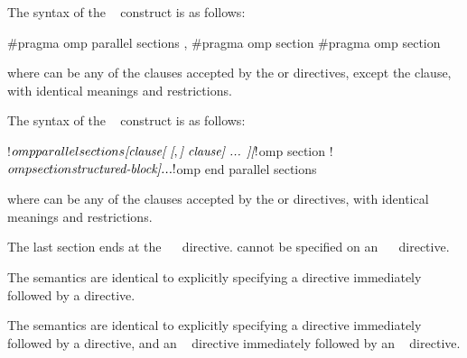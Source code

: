 \syntax
\begin{ccppspecific}
The syntax of the ~ construct is as follows:

\begin{ompcPragma}
#pragma omp parallel sections \plc{[clause[ [},\plc{] clause] ... ] new-line}
    {
    \plc{[}#pragma omp section \plc{new-line]}
    \plc{[}#pragma omp section 
        \plc{structured-block]}
    }
\end{ompcPragma}

where  can be any of the clauses accepted by the  or 
directives, except the  clause, with identical meanings and restrictions.
\end{ccppspecific}

\begin{fortranspecific}
The syntax of the ~ construct is as follows:

\begin{ompfPragma}
!$omp parallel sections \plc{[clause[ [},\plc{] clause] ... ]}
    \plc{[}!$omp section\plc{]}
    \plc{[}!$omp section
        \plc{structured-block]}
    \plc{...}
!$omp end parallel sections
\end{ompfPragma}

where  can be any of the clauses accepted by the  or 
directives, with identical meanings and restrictions.

The last section ends at the ~~ directive.  cannot be
specified on an ~~ directive.
\end{fortranspecific}

\descr
\begin{ccppspecific}
The semantics are identical to explicitly specifying a  directive immediately
followed by a  directive.
\end{ccppspecific}

\begin{fortranspecific}
The semantics are identical to explicitly specifying a  directive immediately
followed by a  directive, and an ~ directive immediately
followed by an ~ directive.
\end{fortranspecific}

